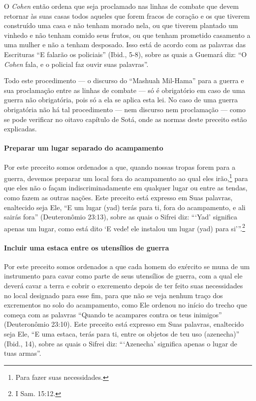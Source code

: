 O \textit{Cohen} então ordena que seja proclamado nas linhas de combate que
devem retornar às suas casas todos aqueles que forem fracos de coração e
os que tiverem construído uma casa e não tenham morado nela, ou que
tiverem plantado um vinhedo e não tenham comido seus frutos, ou que
tenham prometido casamento a uma mulher e não a tenham desposado. Isso
está de acordo com as palavras das Escrituras ``E falarão os policiais''
(Ibid., 5-8), sobre as quais a Guemará diz: ``O \textit{Cohen} fala, e o
policial faz ouvir suas palavras''.

Todo este procedimento --- o discurso do ``Mashuah Mil-Hama'' para a
guerra e sua proclamação entre as linhas de combate --- só é obrigatório
em caso de uma guerra não obrigatória, pois só a ela se aplica esta lei.
No caso de uma guerra obrigatória não há tal procedimento --- nem
discurso nem proclamação --- como se pode verificar no oitavo capítulo
de Sotá, onde as normas deste preceito estão explicadas.

\paragraph{Preparar um lugar separado do acampamento}

Por este preceito somos ordenados a que, quando nossas tropas forem para a guerra, devemos preparar um local fora do acampamento ao qual
eles irão,\footnote{Para fazer suas necessidades.} para que eles não o façam
indiscriminadamente em qualquer lugar ou entre as tendas, como fazem as outras nações. Este preceito está expresso em Suas palavras, enaltecido seja Ele, ``E um lugar (yad) terás para ti, fora
do acampamento, e ali sairás fora'' (Deuteronômio 23:13), sobre as quais
o Sifrei diz: ```Yad' significa apenas um lugar, como está dito `E vede!
ele instalou um lugar (yad) para si'''.\footnote{I Sam. 15:12.}

\paragraph{Incluir uma estaca entre os utensílios de guerra}

Por este preceito somos ordenados a que cada homem do exército se muna
de um instrumento para cavar como parte de seus utensílios de guerra,
com a qual ele deverá cavar a terra e cobrir o excremento depois de ter
feito suas necessidades no local designado para esse fim, para que não
se veja nenhum traço dos excrementos no solo do acampamento, como Ele
ordenou no início do trecho que começa com as palavras ``Quando te
acampares contra os teus inimigos'' (Deuteronômio 23:10). Este preceito está expresso em
Suas palavras, enaltecido seja Ele, ``E uma estaca, terás para ti, entre
os objetos de teu uso (azenecha)'' (Ibid., 14), sobre as quais o Sifrei
diz: ```Azenecha' significa apenas o lugar de tuas armas''.

